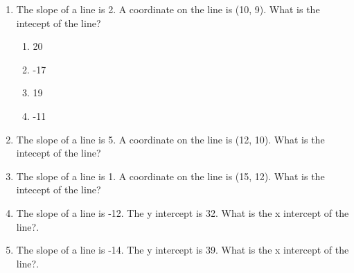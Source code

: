\documentclass[fleqn]{article}
\begin{document}
\ExamNameLine
\begin{enumerate}
\item The slope of a line is 2. A coordinate on the line is (10, 9). What is the intecept of the line?
\begin{enumerate}
\item 20
\item -17
\item 19
\item -11
\end{enumerate}
\item The slope of a line is 5. A coordinate on the line is (12, 10). What is the intecept of the line?
\item The slope of a line is 1. A coordinate on the line is (15, 12). What is the intecept of the line?
\item The slope of a line is -12. The y intercept is 32. What is the x intercept of the line?.
\item The slope of a line is -14. The y intercept is 39. What is the x intercept of the line?.
\end{enumerate}
\end{document}
